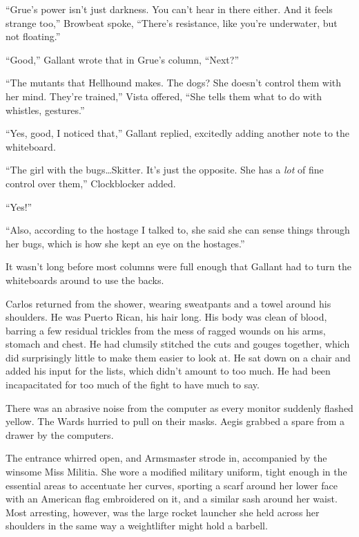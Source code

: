 ``Grue's power isn't just darkness.  You can't hear in there either.  And it feels strange too,'' Browbeat spoke, ``There's resistance, like you're underwater, but not floating.''



``Good,'' Gallant wrote that in Grue's column, ``Next?''



``The mutants that Hellhound makes.  The dogs?  She doesn't control them with her mind.  They're trained,'' Vista offered, ``She tells them what to do with whistles, gestures.''



``Yes, good, I noticed that,'' Gallant replied, excitedly adding another note to the whiteboard.



``The girl with the bugs\ldots Skitter.  It's just the opposite.  She has a \emph{lot} of fine control over them,'' Clockblocker added.



``Yes!''



``Also, according to the hostage I talked to, she said she can sense things through her bugs, which is how she kept an eye on the hostages.''



It wasn't long before most columns were full enough that Gallant had to turn the whiteboards around to use the backs.



Carlos returned from the shower, wearing sweatpants and a towel around his shoulders.  He was Puerto Rican, his hair long.  His body was clean of blood, barring a few residual trickles from the mess of ragged wounds on his arms, stomach and chest.  He had clumsily stitched the cuts and gouges together, which did surprisingly little to make them easier to look at.  He sat down on a chair and added his input for the lists, which didn't amount to too much.  He had been incapacitated for too much of the fight to have much to say.



There was an abrasive noise from the computer as every monitor suddenly flashed yellow.  The Wards hurried to pull on their masks.  Aegis grabbed a spare from a drawer by the computers.



The entrance whirred open, and Armsmaster strode in, accompanied by the winsome Miss Militia.  She wore a modified military uniform, tight enough in the essential areas to accentuate her curves, sporting a scarf around her lower face with an American  flag embroidered on it, and a similar sash around her waist.  Most arresting, however, was the large rocket launcher she held across her shoulders in the same way a weightlifter might hold a barbell.




